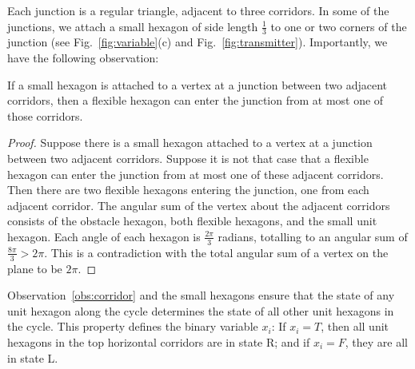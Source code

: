 Each junction is a regular triangle, adjacent to three corridors. 
In some of the junctions, we attach a small hexagon of side length $\frac{1}{3}$ to one or two corners of the junction (see Fig.~\ref{fig:variable}(c) and Fig.~\ref{fig:transmitter}). 
Importantly, we have the following observation:
\begin{observation}\label{obs:junction}
If a small hexagon is attached to a vertex at a junction between two adjacent corridors, then a flexible hexagon can enter the junction from at most one of those corridors.
\end{observation}
\begin{proof}
Suppose there is a small hexagon attached to a vertex at a junction between two adjacent corridors.
Suppose it is not that case that a flexible hexagon can enter the junction from at most one of these adjacent corridors.
Then there are two flexible hexagons entering the junction, one from each adjacent corridor.
The angular sum of the vertex about the adjacent corridors consists of the obstacle hexagon, both flexible hexagons, and the small unit hexagon.
Each angle of each hexagon is $\frac{2 \pi}{3}$ radians, totalling to an angular sum of $\frac{8 \pi}{3} > 2 \pi$.
This is a contradiction with the total angular sum of a vertex on the plane to be $2 \pi$.
\end{proof}

Observation~\ref{obs:corridor} and the small hexagons ensure that the state of any unit hexagon along the cycle determines the state of all other unit hexagons in the cycle. 
This property defines the binary variable $x_i$: If $x_i=T$, then all unit hexagons in the top horizontal corridors are in state R; and if $x_i=F$, they are all in state L.

